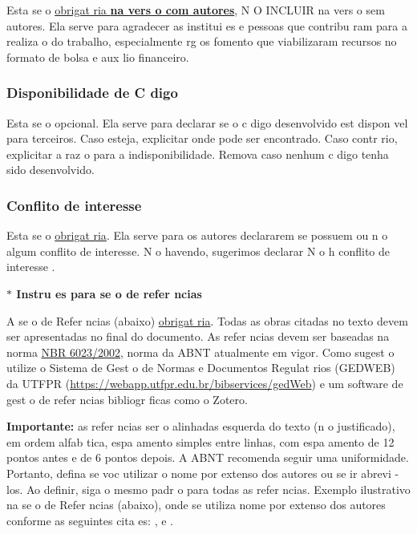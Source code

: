 \documentclass{article}
\begin{document}
Esta se o   \underline{obrigat ria \textbf{na vers o com autores}}, N O INCLUIR na vers o sem autores. Ela serve para agradecer as institui es e pessoas que contribu ram para a realiza o do trabalho, especialmente  rg os fomento que viabilizaram recursos no formato de bolsa e aux lio financeiro. 

\subsubsection{Disponibilidade de C digo}

Esta se o   opcional. Ela serve para declarar se o c digo desenvolvido est  dispon vel para terceiros. Caso esteja, explicitar onde pode ser encontrado. Caso contr rio, explicitar a raz o para a indisponibilidade. Remova caso nenhum c digo tenha sido desenvolvido. 

\subsubsection{Conflito de interesse}

Esta se o   \underline{obrigat ria}. Ela serve para os autores declararem se possuem ou n o algum conflito de interesse. N o havendo, sugerimos declarar  N o h  conflito de interesse .

\begin{center}
    \textbf{$\ast$ Instru es para se o de refer ncias}
\end{center}


A se o de Refer ncias (abaixo)   \underline{obrigat ria}. Todas as obras citadas no texto devem ser apresentadas no final do documento. As refer ncias devem ser baseadas na norma \href{http://portal.utfpr.edu.br/alunos/normas-academicas/normas-para-trabalhos-academicos}{NBR 6023/2002}, norma da ABNT atualmente em vigor. Como sugest o utilize o Sistema de Gest o de Normas e Documentos Regulat rios (GEDWEB) da UTFPR (\url{https://webapp.utfpr.edu.br/bibservices/gedWeb}) e um software de gest o de refer ncias bibliogr ficas como o Zotero.

\textbf{Importante:} as refer ncias ser o alinhadas   esquerda do texto (n o justificado), em ordem alfab tica, espa amento simples entre linhas, com espa amento de 12 pontos antes e de 6 pontos depois. A ABNT recomenda seguir uma uniformidade. Portanto, defina se voc  utilizar  o nome por extenso dos autores ou se ir  abrevi -los. Ao definir, siga o mesmo padr o para todas as refer ncias. 
Exemplo ilustrativo na se o de Refer ncias (abaixo), onde se utiliza  nome por extenso dos autores conforme as seguintes cita es: 
\cite{volpato2016autoria},
\cite{schneider2020efeitos} e
\cite{MEDEIROS_2021}.

\printbibliography[title={\raggedright{Refer ncias}}]

\end{document}
